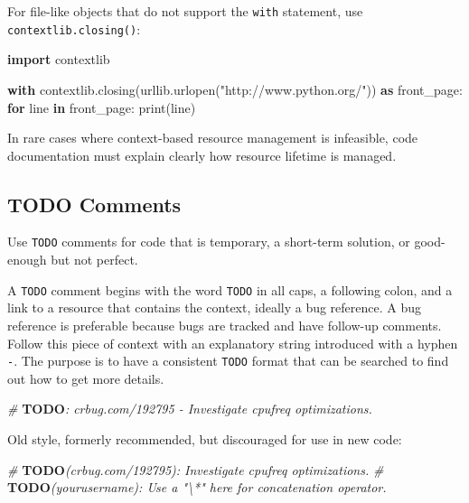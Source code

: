 \documentclass[
]{article}
\newenvironment{Shaded}{}{}
\newcommand{\AlertTok}[1]{\textcolor[rgb]{1.00,0.00,0.00}{\textbf{#1}}}
\newcommand{\BuiltInTok}[1]{\textcolor[rgb]{0.00,0.50,0.00}{#1}}
\newcommand{\CommentTok}[1]{\textcolor[rgb]{0.38,0.63,0.69}{\textit{#1}}}
\newcommand{\ControlFlowTok}[1]{\textcolor[rgb]{0.00,0.44,0.13}{\textbf{#1}}}
\newcommand{\ImportTok}[1]{\textcolor[rgb]{0.00,0.50,0.00}{\textbf{#1}}}
\newcommand{\KeywordTok}[1]{\textcolor[rgb]{0.00,0.44,0.13}{\textbf{#1}}}
\newcommand{\NormalTok}[1]{#1}
\newcommand{\StringTok}[1]{\textcolor[rgb]{0.25,0.44,0.63}{#1}}
\begin{document}
For file-like objects that do not support the \texttt{with} statement,
use \texttt{contextlib.closing()}:

\begin{samepage}
\begin{Shaded}
\begin{Highlighting}[]
\ImportTok{import}\NormalTok{ contextlib}

\ControlFlowTok{with}\NormalTok{ contextlib.closing(urllib.urlopen(}\StringTok{"http://www.python.org/"}\NormalTok{)) }\ImportTok{as}\NormalTok{ front\_page:}
    \ControlFlowTok{for}\NormalTok{ line }\KeywordTok{in}\NormalTok{ front\_page:}
        \BuiltInTok{print}\NormalTok{(line)}
\end{Highlighting}
\end{Shaded}
\end{samepage}

In rare cases where context-based resource management is infeasible,
code documentation must explain clearly how resource lifetime is
managed.

\subsection{TODO Comments}

Use \texttt{TODO} comments for code that is temporary, a short-term
solution, or good-enough but not perfect.

A \texttt{TODO} comment begins with the word \texttt{TODO} in all caps,
a following colon, and a link to a resource that contains the context,
ideally a bug reference. A bug reference is preferable because bugs are
tracked and have follow-up comments. Follow this piece of context with
an explanatory string introduced with a hyphen \texttt{-}. The purpose
is to have a consistent \texttt{TODO} format that can be searched to
find out how to get more details.

\begin{samepage}
\begin{Shaded}
\begin{Highlighting}[]
\CommentTok{\# }\AlertTok{TODO}\CommentTok{: crbug.com/192795 {-} Investigate cpufreq optimizations.}
\end{Highlighting}
\end{Shaded}
\end{samepage}

Old style, formerly recommended, but discouraged for use in new code:

\begin{samepage}
\begin{Shaded}
\begin{Highlighting}[]
\CommentTok{\# }\AlertTok{TODO}\CommentTok{(crbug.com/192795): Investigate cpufreq optimizations.}
\CommentTok{\# }\AlertTok{TODO}\CommentTok{(yourusername): Use a "\textbackslash{}*" here for concatenation operator.}
\end{Highlighting}
\end{Shaded}
\end{samepage}
\end{document}

